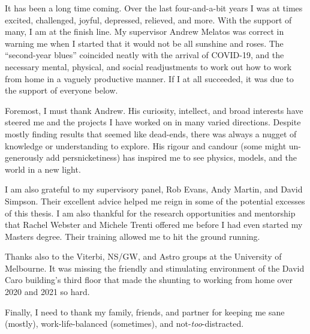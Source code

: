 It has been a long time coming. Over the last four-and-a-bit years I was at times excited, challenged, joyful, depressed, relieved, and more. With the support of many, I am at the finish line. My supervisor Andrew Melatos was correct in warning me when I started that it would not be all sunshine and roses. The ``second-year blues'' coincided neatly with the arrival of COVID-19, and the necessary mental, physical, and social readjustments to work out how to work from home in a vaguely productive manner. If I at all succeeded, it was due to the support of everyone below.

Foremost, I must thank Andrew. His curiosity, intellect, and broad interests have steered me and the projects I have worked on in many varied directions. Despite mostly finding results that seemed like dead-ends, there was always a nugget of knowledge or understanding to explore. His rigour and candour (some might un-generously add persnicketiness) has inspired me to see physics, models, and the world in a new light.

I am also grateful to my supervisory panel, Rob Evans, Andy Martin, and David Simpson. Their excellent advice helped me reign in some of the potential excesses of this thesis. I am also thankful for the research opportunities and mentorship that Rachel Webster and Michele Trenti offered me before I had even started my Masters degree. Their training allowed me to hit the ground running.

Thanks also to the Viterbi, NS/GW, and Astro groups at the University of Melbourne. It was missing the friendly and stimulating environment of the David Caro building's third floor that made the shunting to working from home over 2020 and 2021 so hard. 

Finally, I need to thank my family, friends, and partner for keeping me sane (mostly), work-life-balanced (sometimes), and not-\emph{too}-distracted. 